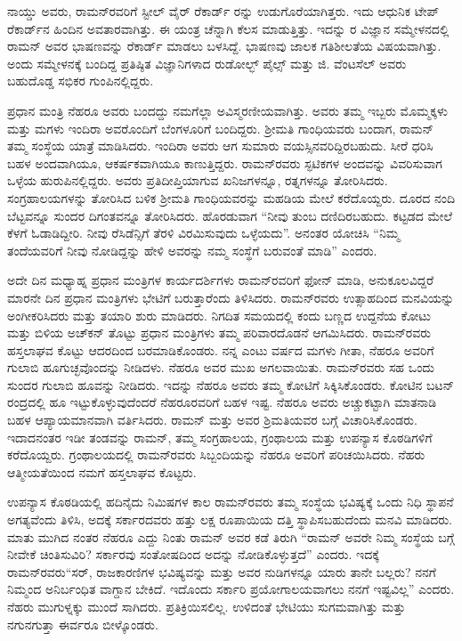 ನಾಯ್ಡು ಅವರು, ರಾಮನ್‍ರವರಿಗೆ ಸ್ಟೀಲ್ ವೈರ್ ರೆಕಾರ್ಡ್ ರನ್ನು ಉಡುಗೊರೆಯಾಗಿತ್ತರು. ಇದು ಆಧುನಿಕ ಟೇಪ್ ರೆಕಾರ್ಡ್‌ನ ಹಿಂದಿನ ಅವತಾರವಾಗಿತ್ತು. ಈ ಯಂತ್ರ ಚೆನ್ನಾಗಿ ಕೆಲಸ ಮಾಡುತ್ತಿತ್ತು. ಇದನ್ನು ರ ವಿಜ್ಞಾನ ಸಮ್ಮೇಳನದಲ್ಲಿ ರಾಮನ್ ಅವರ ಭಾಷಣವನ್ನು ರೆಕಾರ್ಡ್ ಮಾಡಲು ಬಳಸಿದ್ದೆ. ಭಾಷಣವು ಜಾಲಕ ಗತಿಶೀಲತೆಯ ವಿಷಯವಾಗಿತ್ತು. ಅಂದು ಸಮ್ಮೇಳನಕ್ಕೆ ಬಂದಿದ್ದ ಪ್ರತಿಷ್ಠಿತ ವಿಜ್ಞಾನಿಗಳಾದ ರುಡೋಲ್ಭ್ ಪೈಲ್ಸ್ ಮತ್ತು ಜಿ. ವೆಂಟಸೆಲ್ ಅವರು ಬಹುದೊಡ್ಡ ಸಭಿಕರ ಗುಂಪಿನಲ್ಲಿದ್ದರು.



ಪ್ರಧಾನ ಮಂತ್ರಿ ನೆಹರೂ ಅವರು ಬಂದದ್ದು ನಮಗೆಲ್ಲಾ ಅವಿಸ್ಮರಣೀಯವಾಗಿತ್ತು. ಅವರು ತಮ್ಮ ಇಬ್ಬರು ಮೊಮ್ಮಕ್ಕಳು ಮತ್ತು ಮಗಳು ಇಂದಿರಾ ಅವರೊಂದಿಗೆ ಬೆಂಗಳೂರಿಗೆ ಬಂದಿದ್ದರು. ಶ‍್ರೀಮತಿ ಗಾಂಧಿಯವರು ಬಂದಾಗ, ರಾಮನ್ ತಮ್ಮ ಸಂಸ್ಥೆಯ ಯಾತ್ರೆ ಮಾಡಿಸಿದರು. ಇಂದಿರಾ ಅವರು ಆಗ ಸುಮಾರು  ವಯಸ್ಸಿನವರಿದ್ದಿರಬಹುದು. ಸೀರೆ ಧರಿಸಿ ಬಹಳ ಅಂದವಾಗಿಯೂ, ಆಕರ್ಷಕವಾಗಿಯೂ ಕಾಣುತ್ತಿದ್ದರು. ರಾಮನ್‍ರವರು ಸ್ಫಟಿಕಗಳ ಅಂದವನ್ನು ವಿವರಿಸುವಾಗ ಒಳ್ಳೆಯ ಹುರುಪಿನಲ್ಲಿದ್ದರು. ಅವರು ಪ್ರತಿದೀಪ್ತಿಯಾಗುವ ಖನಿಜಗಳನ್ನೂ, ರತ್ನಗಳನ್ನೂ ತೋರಿಸಿದರು. ಸಂಗ್ರಹಾಲಯಗಳನ್ನು ತೋರಿಸಿದ ಬಳಿಕ ಶ‍್ರೀಮತಿ ಗಾಂಧಿಯವರನ್ನು ಮಹಡಿಯ ಮೇಲೆ ಕರೆದೊಯ್ದರು. ದೂರದ ನಂದಿ ಬೆಟ್ಟವನ್ನೂ ಸುಂದರ ದಿಗಂತವನ್ನೂ ತೋರಿಸಿದರು. ಹೊರಡುವಾಗ “ನೀವು ತುಂಬ ದಣಿದಿರಬಹುದು. ಕಟ್ಟಡದ ಮೇಲೆ ಕೆಳಗೆ ಓಡಾಡಿದ್ದೀರಿ. ನೀವು ರೆಸಿಡೆನ್ಸಿಗೆ ತೆರಳಿ ವಿರಮಿಸುವುದು ಒಳ್ಳೆಯದು”. ಅನಂತರ ಯೋಚಿಸಿ “ನಿಮ್ಮ ತಂದೆಯವರಿಗೆ ನೀವು ನೋಡಿದ್ದನ್ನು ಹೇಳಿ ಅವರನ್ನು ನಮ್ಮ ಸಂಸ್ಥೆಗೆ ಬರುವಂತೆ ಮಾಡಿ” ಎಂದರು.

ಅದೇ ದಿನ ಮಧ್ಯಾಹ್ನ ಪ್ರಧಾನ ಮಂತ್ರಿಗಳ ಕಾರ್ಯದರ್ಶಿಗಳು ರಾಮನ್‍ರವರಿಗೆ ಫೋನ್ ಮಾಡಿ, ಅನುಕೂಲವಿದ್ದರೆ ಮಾರನೇ ದಿನ ಪ್ರಧಾನ ಮಂತ್ರಿಗಳು ಭೇಟಿಗೆ ಬರುತ್ತಾರೆಂದು ತಿಳಿಸಿದರು. ರಾಮನ್‍ರವರು ಉತ್ಸಾಹದಿಂದ ಮನವಿಯನ್ನು ಅಂಗೀಕರಿಸಿದರು ಮತ್ತು ತಯಾರಿ ಶುರು ಮಾಡಿದರು. ನಿಗದಿತ ಸಮಯದಲ್ಲಿ ಕಂದು ಬಣ್ಣದ ಉದ್ದನೆಯ ಕೋಟು ಮತ್ತು ಬಿಳಿಯ ಅಚ್‍ಕನ್ ತೊಟ್ಟು ಪ್ರಧಾನ ಮಂತ್ರಿಗಳು ತಮ್ಮ ಪರಿವಾರದೊಡನೆ ಆಗಮಿಸಿದರು. ರಾಮನ್‍ರವರು ಹಸ್ತಲಾಘವ ಕೊಟ್ಟು ಆದರದಿಂದ ಬರಮಾಡಿಕೊಂಡರು. ನನ್ನ ಎಂಟು ವರ್ಷದ ಮಗಳು ಗೀತಾ, ನೆಹರೂ ಅವರಿಗೆ ಗುಲಾಬಿ ಹೂಗುಚ್ಛವೊಂದನ್ನು ನೀಡಿದಳು. ನೆಹರೂ ಅವರ ಮುಖ ಅಗಲವಾಯಿತು. ರಾಮನ್‍ರವರು ಸಹ ಒಂದು ಸುಂದರ ಗುಲಾಬಿ ಹೂವನ್ನು ನೀಡಿದರು. ಇದನ್ನು ನೆಹರೂ ಅವರು ತಮ್ಮ ಕೋಟಿಗೆ ಸಿಕ್ಕಿಸಿಕೊಂಡರು. ಕೋಟಿನ ಬಟನ್ ರಂದ್ರದಲ್ಲಿ ಹೂ ಇಟ್ಟುಕೊಳ್ಳುವುದೆಂದರೆ ನೆಹರೂರವರಿಗೆ ಬಹಳ ಇಷ್ಟ. ನೆಹರೂ ಅವರು ಅಚ್ಚುಕಟ್ಟಾಗಿ ಮಾತನಾಡಿ ಬಹಳ ಆಪ್ಯಾಯಮಾನ\-ವಾಗಿ ವರ್ತಿಸಿದರು. ರಾಮನ್ ಮತ್ತು ಅವರ ಶ್ರಿಮತಿಯವರ ಬಗ್ಗೆ ವಿಚಾರಿಸಿಕೊಂಡರು. ಇದಾದನಂತರ ಇಡೀ ತಂಡವನ್ನು ರಾಮನ್, ತಮ್ಮ ಸಂಗ್ರಹಾಲಯ, ಗ್ರಂಥಾಲಯ ಮತ್ತು ಉಪನ್ಯಾಸ ಕೊಠಡಿಗಳಿಗೆ ಕರೆದೊಯ್ದರು. ಗ್ರಂಥಾಲಯದಲ್ಲಿ ರಾಮನ್‍ರವರು ಸಿಬ್ಬಂದಿಯನ್ನು ನೆಹರೂ ಅವರಿಗೆ ಪರಿಚಯಿಸಿದರು. ನೆಹರು ಆತ್ಮೀಯತೆಯಿಂದ ನಮಗೆ ಹಸ್ತಲಾಘವ ಕೊಟ್ಟರು.

ಉಪನ್ಯಾಸ ಕೊಠಡಿಯಲ್ಲಿ ಹದಿನೈದು ನಿಮಿಷಗಳ ಕಾಲ ರಾಮನ್‍ರವರು ತಮ್ಮ ಸಂಸ್ಥೆಯ ಭವಿಷ್ಯಕ್ಕೆ ಒಂದು ನಿಧಿ ಸ್ಥಾಪನೆ ಅಗತ್ಯವೆಂದು ತಿಳಿಸಿ, ಅದಕ್ಕೆ ಸರ್ಕಾರದವರು ಹತ್ತು ಲಕ್ಷ ರೂಪಾಯಿಯ ದತ್ತಿ ಸ್ಥಾಪಿಸಬಹುದೆಂದು ಮನವಿ ಮಾಡಿದರು. ಮಾತು ಮುಗಿದ ನಂತರ ನೆಹರೂ ಎದ್ದು ನಿಂತು ರಾಮನ್ ಅವರ ಕಡೆ ತಿರುಗಿ \enginline{-} “ರಾಮನ್ ಅವರೇ ನಿಮ್ಮ ಸಂಸ್ಥೆಯ ಬಗ್ಗೆ ನೀವೇಕೆ ಚಿಂತಿಸುವಿರಿ? ಸರ್ಕಾರವು ಸಂತೋಷದಿಂದ ಅದನ್ನು ನೋಡಿಕೊಳ್ಳುತ್ತದೆ” ಎಂದರು. ಇದಕ್ಕೆ ರಾಮನ್‍ರವರು\enginline{--}\break “ಸರ್, ರಾಜಕಾರಣಿಗಳ ಭವಿಷ್ಯವನ್ನು ಮತ್ತು ಅವರ ನುಡಿಗಳನ್ನೂ ಯಾರು ತಾನೇ ಬಲ್ಲರು? ನನಗೆ ನಿಮ್ಮಂದ ಅನಿರ್ಬಂಧಿತ ವಾಗ್ದಾನ ಬೇಕಿದೆ. ಇದೊಂದು ಸರ್ಕಾರಿ ಪ್ರಯೋಗಾಲಯವಾಗಲು ನನಗೆ ಇಷ್ಟವಿಲ್ಲ” ಎಂದರು. ನೆಹರು ಮುಗುಳ್ನಕ್ಕು ಮುಂದೆ ಸಾಗಿದರು. ಪ್ರತಿಕ್ರಿಯಿಸಲಿಲ್ಲ. ಉಳಿದಂತೆ ಭೇಟಿಯು ಸುಗಮವಾಗಿತ್ತು ಮತ್ತು ನಗುನಗುತ್ತಾ ಈರ್ವರೂ ಬೀಳ್ಕೊಂಡರು.

